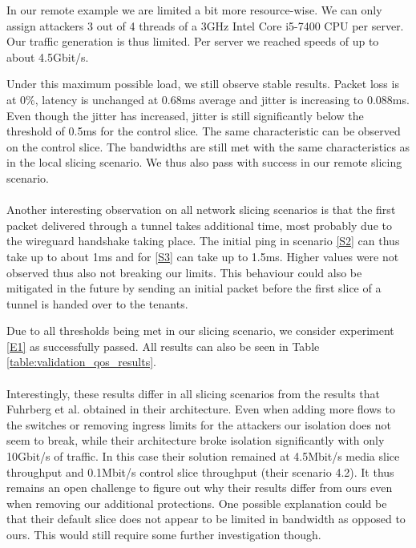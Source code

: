 \begin{description}[style=multiline, labelwidth=0.7cm]
    In our remote example we are limited a bit more resource-wise. We can only assign attackers 3 out of 4 threads of a 3GHz Intel Core i5-7400 CPU per server. Our traffic generation is thus limited. Per server we reached speeds of up to about 4.5Gbit/s.

    Under this maximum possible load, we still observe stable results. Packet loss is at 0\%, \gls{latency} is unchanged at 0.68ms average and \gls{jitter} is increasing to 0.088ms. Even though the \gls{jitter} has increased, \gls{jitter} is still significantly below the threshold of 0.5ms for the control slice. The same characteristic can be observed on the control slice. The \gls{bandwidth}s are still met with the same characteristics as in the local slicing scenario. We thus also pass with success in our remote slicing scenario.

    \paragraph{} Another interesting observation on all network slicing scenarios is that the first packet delivered through a tunnel takes additional time, most probably due to the \gls{wireguard} handshake taking place. The initial ping in scenario \ref{S2} can thus take up to about 1ms and for \ref{S3} can take up to 1.5ms. Higher values were not observed thus also not breaking our limits. This behaviour could also be mitigated in the future by sending an initial packet before the first slice of a tunnel is handed over to the tenants.

    Due to all thresholds being met in our slicing scenario, we consider experiment \ref{E1} as successfully passed. All results can also be seen in Table \ref{table:validation_qos_results}.

    \paragraph{} Interestingly, these results differ in all slicing scenarios from the results that Fuhrberg et al. \cite{SE4} obtained in their architecture. Even when adding more flows to the switches or removing ingress limits for the attackers our isolation does not seem to break, while their architecture broke isolation significantly with only 10Gbit/s of traffic. In this case their solution remained at 4.5Mbit/s media slice throughput and 0.1Mbit/s control slice throughput (their scenario 4.2). It thus remains an open challenge to figure out why their results differ from ours even when removing our additional protections. One possible explanation could be that their default slice does not appear to be limited in \gls{bandwidth} as opposed to ours. This would still require some further investigation though.


\end{description}
